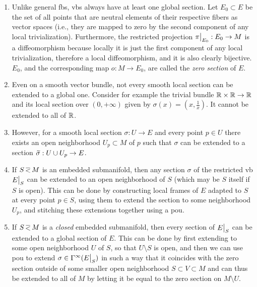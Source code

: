 \begin{rem}\label{rem zero section, extending section}
\begin{enumerate}
    \item Unlike general \glspl{fb}, \glspl{vb} always have at least one global section. Let $E_0\subset E$ be the set of all points that are neutral elements of their respective fibers as vector spaces (i.e., they are mapped to zero by the second component of any local trivialization). Furthermore, the restricted projection $\restr{\pi}{E_0}:E_0\to M$ is a diffeomorphism because locally it is just the first component of any local trivialization, therefore a local diffeomorphism, and it is also clearly bijective. $E_0$, and the corresponding map $o:M\to E_0$, are called the \emph{zero section} of $E$.
    \item Even on a smooth vector bundle, not every smooth local section can be extended to a global one. Consider for example the trivial bundle $\mathbb{R}\times\mathbb{R}\to \mathbb{R}$ and its local section over $(0,+\infty)$ given by $\sigma(x)=(x,\frac 1x)$. It cannot be extended to all of $\mathbb{R}$. 
    \item However, for a smooth local section $\sigma:U\to E$ and every point $p\in U$ there exists an open neighborhood $U_p\subset M$ of $p$ such that $\sigma$ can be extended to a section $\wt{\sigma}:U\cup U_p\to E$.
    \item If $S\emb M$ is an embedded submanifold, then any section $\sigma$ of the restricted \gls{vb} $\restr{E}{S}$ can be extended to an open neighborhood of $S$ (which may be $S$ itself if $S$ is open). This can be done by constructing local frames of $E$ adapted to $S$ at every point $p\in S$, using them to extend the section to some neighborhood $U_p$, and stitching these extensions together using a \gls{pou}.
    \item If $S\emb M$ is a \emph{closed} embedded submanifold, then every section of $\restr{E}{S}$ can be extended to a global section of $E$. This can be done by first extending to some open neighborhood $U$ of $S$, so that $U\setminus S$ is open, and then we can use \gls{pou} to extend $\sigma\in\Gamma^\infty(\restr{E}{S})$ in such a way that it coincides with the zero section outside of some smaller open neighborhood $S\subset V\subset M$ and can thus be extended to all of $M$ by letting it be equal to the zero section on $M\setminus U$.
\end{enumerate}
\end{rem}


